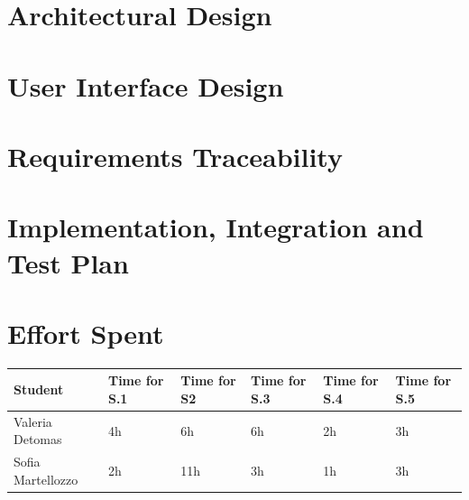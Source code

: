 \documentclass{article}
\begin{document}
\section{Architectural Design}


\newpage
\section{User Interface Design}


\newpage
\section{Requirements Traceability}


\newpage
\section{Implementation, Integration and Test Plan}




\newpage 
\section{Effort Spent}
\begin{table}[h]
      \centering
      \begin{tabular}{|p{3cm}||p{2cm}|p{2cm}|p{2cm}|p{2cm}|p{1cm}|}
            \hline
            Student & Time for S.1 & Time for S2 & Time for S.3 & Time for S.4 & Time for S.5\\
            \hline
            Valeria Detomas & 4h & 6h & 6h & 2h & 3h\\
            \hline
            Sofia Martellozzo & 2h & 11h & 3h & 1h & 3h\\
            \hline
      \end{tabular}
\end{table}

\end{document}
